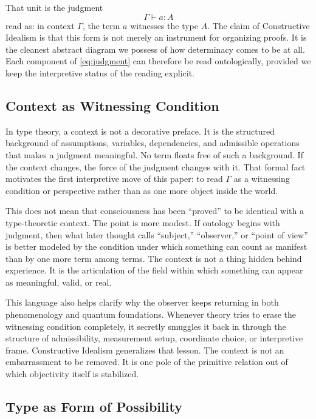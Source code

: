 \documentclass[11pt,a4paper]{article}
\theoremstyle{plain}
\theoremstyle{definition}
\theoremstyle{remark}
\begin{document}
That unit is the judgment
\begin{equation}
\label{eq:judgment}
    \Gamma \vdash a : A
\end{equation}
read as: in context $\Gamma$, the term $a$ witnesses the type $A$.
The claim of Constructive Idealism is that this form is not merely an instrument for organizing proofs.
It is the cleanest abstract diagram we possess of how determinacy comes to be at all.
Each component of \eqref{eq:judgment} can therefore be read ontologically, provided we keep the interpretive status of the reading explicit.


\subsection{Context as Witnessing Condition}
\label{subsec:context}

In type theory, a context is not a decorative preface.
It is the structured background of assumptions, variables, dependencies, and admissible operations that makes a judgment meaningful.
No term floats free of such a background.
If the context changes, the force of the judgment changes with it.
That formal fact motivates the first interpretive move of this paper: to read $\Gamma$ as a witnessing condition or perspective rather than as one more object inside the world.

This does not mean that consciousness has been ``proved'' to be identical with a type-theoretic context.
The point is more modest.
If ontology begins with judgment, then what later thought calls ``subject,'' ``observer,'' or ``point of view'' is better modeled by the condition under which something can count as manifest than by one more term among terms.
The context is not a thing hidden behind experience.
It is the articulation of the field within which something can appear as meaningful, valid, or real.

This language also helps clarify why the observer keeps returning in both phenomenology and quantum foundations.
Whenever theory tries to erase the witnessing condition completely, it secretly smuggles it back in through the structure of admissibility, measurement setup, coordinate choice, or interpretive frame.
Constructive Idealism generalizes that lesson.
The context is not an embarrassment to be removed.
It is one pole of the primitive relation out of which objectivity itself is stabilized.

\subsection{Type as Form of Possibility}
\label{subsec:type}
\end{document}
